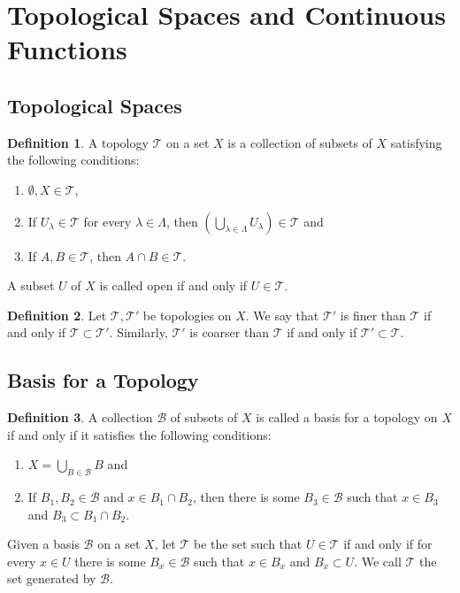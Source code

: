 \documentclass{article}
\theoremstyle{definition}
\newtheorem{definition}{Definition}[subsection]
\theoremstyle{remark}
\newcommand{\paren}[1]{\left( #1 \right)}
\newcommand{\prt}[1]{\mathcal{#1}}
\begin{document}
\section{Topological Spaces and Continuous Functions}

\setcounter{subsection}{11}
\subsection{Topological Spaces}


\begin{definition}\label{def_topology}
    A topology $\prt{T}$ on a set $X$ is a collection of subsets of $X$ satisfying the following conditions: 
    
    \begin{enumerate}
        \item $\emptyset, X \in \prt{T}$,
        \item If $U_\lambda \in \prt{T}$ for every $\lambda \in \Lambda$, then $\paren{\bigcup_{\lambda \in \Lambda} U_\lambda} \in \prt{T}$ and
        \item If $A, B \in \prt{T}$, then $A \cap B \in \prt{T}$.
    \end{enumerate}
    A subset $U$ of $X$ is called open if and only if $U \in \prt{T}$.
\end{definition}

\begin{definition}
    Let $\prt{T}, \prt{T'}$ be topologies on $X$. We say that $\prt{T'}$ is finer than $\prt{T}$ if and only if $\prt{T} \subset \prt{T'}$. Similarly, $\prt{T'}$ is coarser than $\prt{T}$ if and only if $\prt{T'} \subset \prt{T}$. 
\end{definition}

\subsection{Basis for a Topology}

\begin{definition}\label{def_basis}
    A collection $\prt{B}$ of subsets of $X$ is called a basis for a topology on $X$ if and only if it satisfies the following conditions:
    \begin{enumerate}
        \item $X = \bigcup_{B \in \prt{B}} B$ and
        \item If $B_1, B_2 \in \prt{B}$ and $x \in B_1 \cap B_2$, then there is some $B_3 \in \prt{B}$ such that $x \in B_3$ and $B_3 \subset B_1 \cap B_2$.
    \end{enumerate}
    Given a basis $\prt{B}$ on a set $X$, let $\prt{T}$ be the set such that $U \in \prt{T}$ if and only if for every $x \in U$ there is some $B_x \in \prt{B}$ such that $x \in B_x$ and $B_x \subset U$. We call $\prt{T}$ the set generated by $\prt{B}$.
\end{definition}
\end{document}
